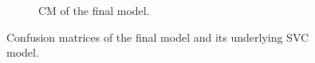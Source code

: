 \begin{figure}[ht]
\begin{subfigure}{.45\textwidth}
        \captionsetup{width=0.9\linewidth}
        \captionsetup{justification=centering}
        \caption{CM of the final model.}
    \end{subfigure}
    \captionsetup{width=0.8\linewidth}
    \captionsetup{justification=centering}
    \caption{Confusion matrices of the final model and its underlying SVC model.}
    \label{fig:final_model_cm}
\end{figure}